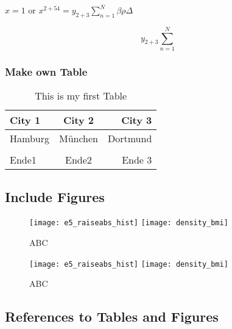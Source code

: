 \documentclass[12pt,a4paper]{article}
\begin{document}
$x=1$ or $x^{2+54}=y_{2+3} \sum_{n=1}^{N} \beta \rho \Delta$

\begin{equation}
y_{2+3} \sum_{n=1}^{N} 
\end{equation}




\subsubsection{Make own Table}

\begin{table}[h]
\caption{This is my first Table}
\label{tab:WageChange}

\begin{center}
\begin{small}

\begin{tabular}{l c r}

\hline \hline
\textbf{City 1} & \textbf{City 2} & \textbf{City 3} \\
\hline
Hamburg & München & Dortmund \\
& & \\
Ende1 & Ende2 & Ende 3 \\
\hline
\end{tabular}
\end{small}
\end{center}

\end{table}

\subsection{Include Figures}

\begin{figure}[h]
\caption{ABC}
\center
\texttt{[image: e5\_raiseabs\_hist]}
\texttt{[image: density\_bmi]}

\end{figure}

\begin{figure}[h]
\caption{ABC}
\center
\texttt{[image: e5\_raiseabs\_hist]}
\texttt{[image: density\_bmi]}
\end{figure}

\subsection{References to Tables and Figures}
\end{document}
